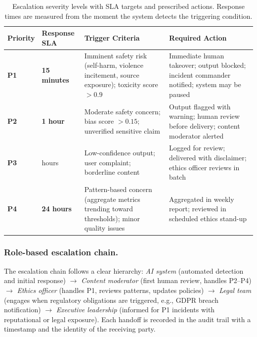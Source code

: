 \begin{table}[t]
\centering
\small
\caption{Escalation severity levels with SLA targets and prescribed actions. Response times are measured from the moment the system detects the triggering condition.}
\label{tab:ch11_escalation_sla}
\setlength{\tabcolsep}{6pt}
\renewcommand{\arraystretch}{1.3}
\begin{tabularx}{\linewidth}{@{}>{\raggedright\arraybackslash}p{1.4cm}>{\raggedright\arraybackslash}p{1.8cm}>{\raggedright\arraybackslash}X>{\raggedright\arraybackslash}X@{}}
\toprule
\rowcolor{gray!15}
\textbf{Priority} & \textbf{Response SLA} & \textbf{Trigger Criteria} & \textbf{Required Action} \\
\midrule
\rowcolor{red!10}
\textcolor{red!70!black}{\textbf{P1}} & \textcolor{red!70!black}{\textbf{15 minutes}} & Imminent safety risk (self-harm, violence incitement, source exposure); toxicity score $> 0.9$ & Immediate human takeover; output blocked; incident commander notified; system may be paused \\
\addlinespace[2pt]
\rowcolor{orange!10}
\textcolor{orange!70!black}{\textbf{P2}} & \textcolor{orange!70!black}{\textbf{1 hour}} & Moderate safety concern; bias score $> 0.15$; unverified sensitive claim & Output flagged with warning; human review before delivery; content moderator alerted \\
\addlinespace[2pt]
\rowcolor{yellow!15}
\textbf{P3} & 4 hours & Low-confidence output; user complaint; borderline content & Logged for review; delivered with disclaimer; ethics officer reviews in batch \\
\addlinespace[2pt]
\rowcolor{green!10}
\textcolor{green!70!black}{\textbf{P4}} & \textcolor{green!70!black}{\textbf{24 hours}} & Pattern-based concern (aggregate metrics trending toward thresholds); minor quality issues & Aggregated in weekly report; reviewed in scheduled ethics stand-up \\
\bottomrule
\end{tabularx}
\end{table}

\subsubsection{Role-based escalation chain.}

The escalation chain follows a clear hierarchy: \emph{AI system} (automated detection and initial response) $\rightarrow$ \emph{Content moderator} (first human review, handles P2--P4) $\rightarrow$ \emph{Ethics officer} (handles P1, reviews patterns, updates policies) $\rightarrow$ \emph{Legal team} (engages when regulatory obligations are triggered, e.g., GDPR breach notification) $\rightarrow$ \emph{Executive leadership} (informed for P1 incidents with reputational or legal exposure). Each handoff is recorded in the audit trail with a timestamp and the identity of the receiving party.

